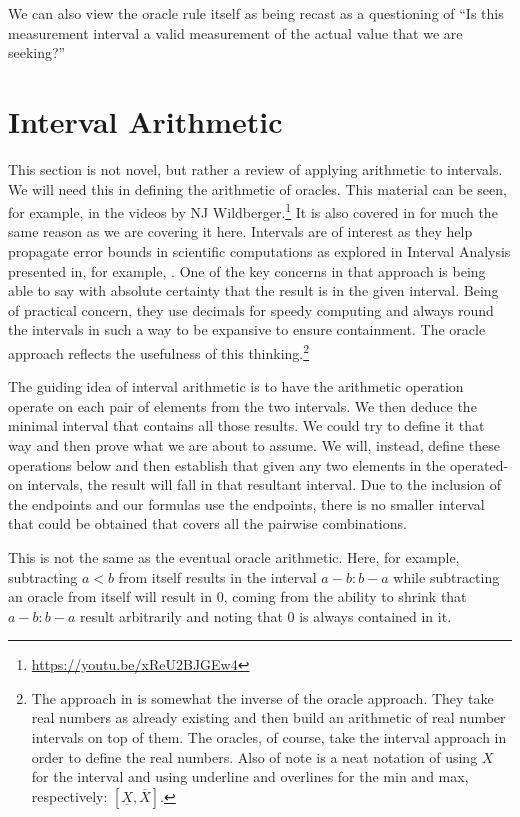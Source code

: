 \documentclass[12pt]{article}
\begin{document}
We can also view the oracle rule itself as being recast as a questioning of ``Is this measurement interval a valid measurement of the actual value that we are seeking?''



\section{Interval Arithmetic}

This section is not novel, but rather a review of applying arithmetic to intervals. We will need this in defining the arithmetic of oracles. This material can be seen, for example, in the videos by NJ Wildberger.\footnote{\url{https://youtu.be/xReU2BJGEw4}} It is also covered in \cite{bridger} for much the same reason as we are covering it here. Intervals are of interest as they help propagate error bounds in scientific computations as explored in Interval Analysis presented in, for example, \cite{moore}. One of the key concerns in that approach is being able to say with absolute certainty that the result is in the given interval. Being of practical concern, they use decimals for speedy computing and always round the intervals in such a way to be expansive to ensure containment. The oracle approach reflects the usefulness of this thinking.\footnote{The approach in \cite{moore} is somewhat the inverse of the oracle approach. They take real numbers as already existing and then build an arithmetic of real number intervals on top of them. The oracles, of course, take the interval approach in order to define the real numbers. Also of note is a neat notation of using $X$ for the interval and using underline and overlines for the min and max, respectively: $[\underline X, \overline X]$.} 

The guiding idea of interval arithmetic is to have the arithmetic operation operate on each pair of elements from the two intervals. We then deduce the minimal interval that contains all those results. We could try to define it that way and then prove what we are about to assume. We will, instead, define these operations below and then establish that given any two elements in the operated-on intervals, the result will fall in that resultant interval. Due to the inclusion of the endpoints and our formulas use the endpoints, there is no smaller interval that could be obtained that covers all the pairwise combinations. 

This is not the same as the eventual oracle arithmetic. Here, for example, subtracting $a<b$ from itself results in the interval $a-b:b-a$ while subtracting an oracle from itself will result in $0$, coming from the ability to shrink that $a-b:b-a$ result arbitrarily and noting that $0$ is always contained in it. 
\end{document}
